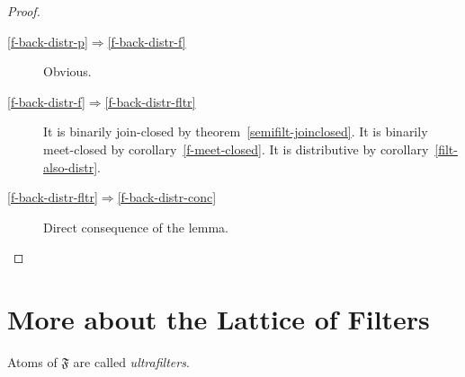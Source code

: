 \begin{proof}
~
\begin{description}
\item [{\ref{f-back-distr-p}$\Rightarrow$\ref{f-back-distr-f}}] Obvious.
\item [{\ref{f-back-distr-f}$\Rightarrow$\ref{f-back-distr-fltr}}] It is binarily join-closed by theorem~\ref{semifilt-joinclosed}.
It is binarily meet-closed by corollary~\ref{f-meet-closed}. It is distributive by
corollary~\ref{filt-also-distr}.
\item [{\ref{f-back-distr-fltr}$\Rightarrow$\ref{f-back-distr-conc}}] Direct
consequence of the lemma.
\end{description}
\end{proof}

\section{More about the Lattice of Filters}
\begin{defn}
Atoms of $\mathfrak{F}$ are called \emph{ultrafilters}.
\end{defn}

